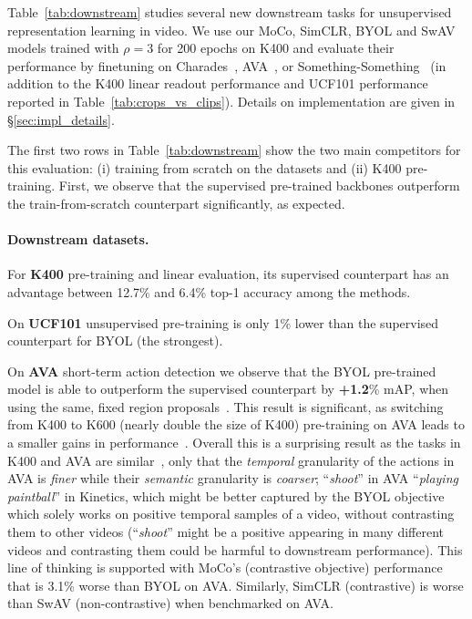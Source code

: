 \documentclass[final]{cvpr}
\newcommand{\tblref}[1]{Table~\ref{#1}}
\begin{document}
	\tblref{tab:downstream} studies several new downstream tasks for unsupervised representation learning in video. We use our MoCo, SimCLR, BYOL and SwAV models trained with  $\rho{=}$3 for 200 epochs on {K400} and evaluate their performance by finetuning on Charades~\cite{Sigurdsson2016}, AVA~\cite{Gu2018},  or Something-Something~\cite{ssv2} (in addition to the K400 linear readout performance and UCF101 performance reported in \tblref{tab:crops_vs_clips}). Details on implementation are given in \S\ref{sec:impl_details}. 
	
	The first two rows in \tblref{tab:downstream} show the two main competitors for this evaluation: (i) training from {scratch} on the datasets and (ii) K400 pre-training. First, we observe that the supervised pre-trained backbones outperform the train-from-scratch counterpart significantly, as expected. 
	
	\paragraph{Downstream datasets.}
	For \textbf{K400} pre-training and linear evaluation, its supervised counterpart has an advantage between 12.7\% and 6.4\% top-1 accuracy among the methods. 
	
	On \textbf{UCF101} unsupervised pre-training is only 1\% lower than the supervised counterpart for BYOL (the strongest). 
	
	On \textbf{AVA} short-term action detection we observe that the BYOL pre-trained model is able to outperform the supervised counterpart by \textbf{+1.2}\% mAP, when using the same, fixed region proposals~\cite{Feichtenhofer19}. This result is significant, as \eg switching from K400 to K600 (nearly double the size of K400) pre-training on AVA leads to a smaller gains in performance~\cite{Feichtenhofer19}.  Overall this is a surprising result as the tasks in K400 and AVA are similar~\cite{Li20}, only that the \textit{temporal} granularity of the actions in AVA is \textit{finer} while their \textit{semantic} granularity is \textit{coarser}; \eg ``\textit{shoot}'' in AVA \vs ``\textit{playing paintball}'' in Kinetics, which might be better captured by the BYOL objective which solely works on positive temporal samples of a video, without contrasting them to other videos (``\textit{shoot}'' might be a positive appearing in many different videos and contrasting them could be harmful to downstream performance). This line of thinking is supported with MoCo's (contrastive objective) performance that is 3.1\% worse than BYOL on AVA. Similarly, SimCLR (contrastive) is worse than SwAV (non-contrastive) when benchmarked on AVA. 
	
\end{document}
